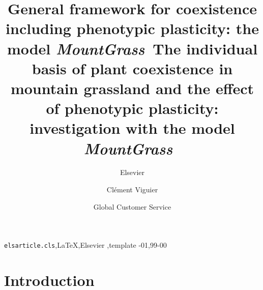 \documentclass[review]{elsarticle}
\newcommand{\model}{\textbf{\textit{MountGrass}}~}
\begin{document}
\begin{frontmatter}

\title{General framework for coexistence including phenotypic plasticity: the model \model}
\title{The individual basis of plant coexistence in mountain grassland and the effect of phenotypic plasticity: investigation with the model \model}

\author{Elsevier}
\address{Radarweg 29, Amsterdam}

\author[clement.viguier@irstea.fr,mysecondaryaddress]{Clément Viguier}

\author[mysecondaryaddress]{Global Customer Service}

\address[mymainaddress]{1600 John F Kennedy Boulevard, Philadelphia}
\address[mysecondaryaddress]{360 Park Avenue South, New York}

\begin{abstract}
\end{abstract}

\begin{keyword}
\texttt{elsarticle.cls}\sep \LaTeX\sep Elsevier \sep template
-01\sep  99-00
\end{keyword}

\end{frontmatter}

\linenumbers

\section{Introduction}
\end{document}
